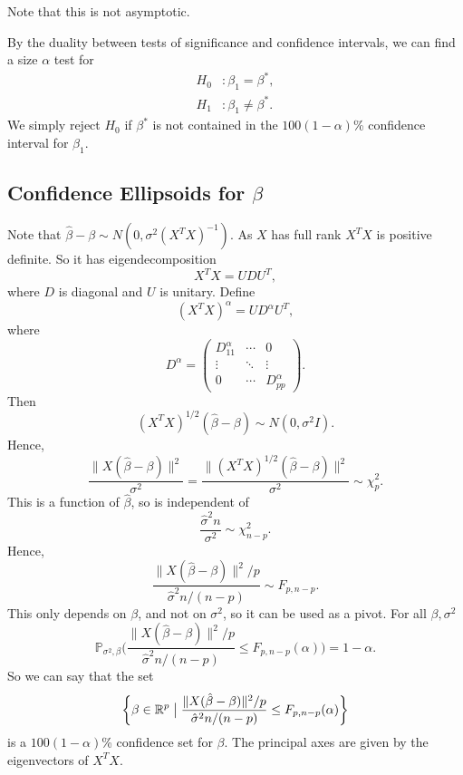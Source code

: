 \documentclass[12pt]{article}
\begin{document}
Note that this is not asymptotic.

By the duality between tests of significance and confidence intervals, we can find a size $\alpha$ test for
\begin{align*}
	H_0 &: \beta_1 = \beta^{\ast}, \\
	H_1 &: \beta_1 \neq \beta^{\ast}.
\end{align*}
We simply reject $H_0$ if $\beta^{\ast}$ is not contained in the $100(1-\alpha)$\% confidence interval for $\beta_1$.

\subsection{Confidence Ellipsoids for \texorpdfstring{$\beta$}{Beta}}
\label{sub:confidence_ellipsoids_for_beta}

Note that $\hat \beta - \beta \sim N(0, \sigma^2(X^{T}X)^{-1})$. As $X$ has full rank $X^{T}X$ is positive definite. So it has eigendecomposition
\[
X^{T}X = U D U^{T},
\]
where $D$ is diagonal and $U$ is unitary. Define
\[
	(X^{T}X)^{\alpha} = U D^{\alpha} U^{T},
\]
where
\[
D^{\alpha} =
\begin{pmatrix}
	D_{11}^{\alpha} & \cdots & 0 \\
			\vdots & \ddots & \vdots \\
			0 & \cdots & D_{pp}^{\alpha}
\end{pmatrix}.
\]
Then
\[
	(X^{T}X)^{1/2}(\hat \beta - \beta) \sim N(0, \sigma^2 I).
\]
Hence,
\[
\frac{\|X(\hat \beta - \beta)\|^2}{\sigma^2} = \frac{\|(X^{T}X)^{1/2}(\hat \beta - \beta)\|^2}{\sigma^2} \sim \chi^2_{p}.
\]
This is a function of $\hat \beta$, so is independent of
\[
\frac{\hat \sigma^2 n}{\sigma^2} \sim \chi^2_{n-p}.
\]
Hence,
\[
\frac{\|X(\hat \beta - \beta)\|^2/p}{\hat \sigma^2 n/(n-p)} \sim F_{p, n-p}.
\]
This only depends on $\beta$, and not on $\sigma^2$, so it can be used as a pivot. For all $\beta, \sigma^2$
\[
\mathbb{P}_{\sigma^2, \beta} \biggl( \frac{\|X(\hat \beta - \beta)\|^2/p}{\hat \sigma^2 n/(n-p)} \leq F_{p,n-p}(\alpha) \biggr) = 1 - \alpha.
\]
So we can say that the set
\[
	\biggl\{\beta \in \mathbb{R}^{p} \bigm| \frac{\|X(\hat \beta - \beta)\|^2/p}{\hat \sigma^2 n/(n-p)} \leq F_{p,n-p}(\alpha) \biggr\}
\]
is a $100(1 - \alpha)$\% confidence set for $\beta$. The principal axes are given by the eigenvectors of $X^{T}X$.

\newpage

\printindex
\end{document}

